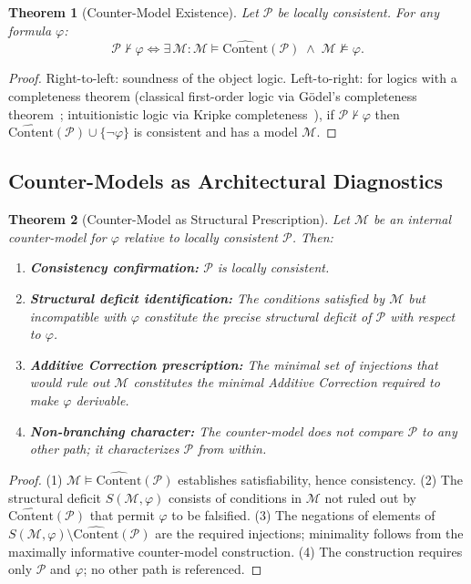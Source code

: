 \documentclass[12pt, a4paper]{article}
\theoremstyle{plain}
\newtheorem{theorem}{Theorem}[section]
\theoremstyle{definition}
\theoremstyle{remark}
\newcommand{\CC}[1]{\widehat{\mathrm{Content}}(#1)}
\begin{document}
\begin{theorem}[Counter-Model Existence]
\label{thm:cm-exist}
Let $\mathcal{P}$ be locally consistent. For any formula $\varphi$:
\[
  \mathcal{P} \nvdash \varphi
  \iff
  \exists\,\mathcal{M} :
  \mathcal{M} \models \CC{\mathcal{P}}
  \;\land\;
  \mathcal{M} \not\models \varphi.
\]
\end{theorem}

\begin{proof}
Right-to-left: soundness of the object logic. Left-to-right: for
logics with a completeness theorem (classical first-order logic via
Gödel's completeness theorem~\cite{Enderton2001}; intuitionistic
logic via Kripke completeness~\cite{Heyting1956}), if
$\mathcal{P} \nvdash \varphi$ then $\CC{\mathcal{P}} \cup \{\neg\varphi\}$
is consistent and has a model $\mathcal{M}$.
\end{proof}

\subsection{Counter-Models as Architectural Diagnostics}
\label{subsec:cm-diagnostic}

\begin{theorem}[Counter-Model as Structural Prescription]
\label{thm:cm-prescribe}
Let $\mathcal{M}$ be an internal counter-model for $\varphi$ relative
to locally consistent $\mathcal{P}$. Then:
\begin{enumerate}
  \item \textbf{Consistency confirmation:} $\mathcal{P}$ is locally
        consistent.
  \item \textbf{Structural deficit identification:} The conditions
        satisfied by $\mathcal{M}$ but incompatible with $\varphi$
        constitute the precise structural deficit of $\mathcal{P}$
        with respect to $\varphi$.
  \item \textbf{Additive Correction prescription:} The minimal set
        of injections that would rule out $\mathcal{M}$ constitutes
        the minimal Additive Correction required to make $\varphi$
        derivable.
  \item \textbf{Non-branching character:} The counter-model does not
        compare $\mathcal{P}$ to any other path; it characterizes
        $\mathcal{P}$ from within.
\end{enumerate}
\end{theorem}

\begin{proof}
(1) $\mathcal{M} \models \CC{\mathcal{P}}$ establishes satisfiability,
hence consistency.
(2) The structural deficit $S(\mathcal{M},\varphi)$ consists of
conditions in $\mathcal{M}$ not ruled out by $\CC{\mathcal{P}}$ that
permit $\varphi$ to be falsified.
(3) The negations of elements of $S(\mathcal{M},\varphi) \setminus
\CC{\mathcal{P}}$ are the required injections; minimality follows from
the maximally informative counter-model construction.
(4) The construction requires only $\mathcal{P}$ and $\varphi$; no
other path is referenced.
\end{proof}
\end{document}

